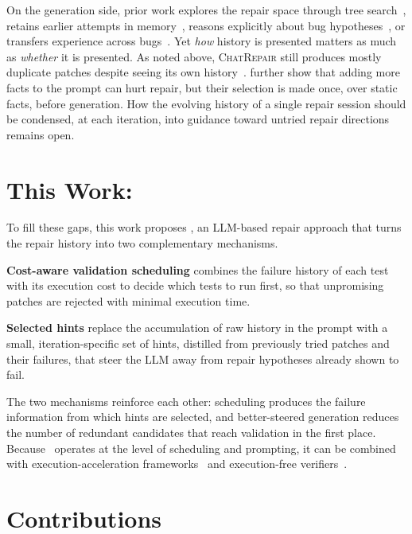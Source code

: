On the generation side, prior work explores the repair space through tree
search~\citep{antoniades2025swesearch}, retains earlier attempts in
memory~\citep{xia2024chatrepair,shinn2023reflexion}, reasons explicitly about
bug hypotheses~\citep{kang2025autosd,yin2024thinkrepair}, or transfers
experience across bugs~\citep{chen2025sweexp}. Yet \emph{how} history is
presented matters as much as \emph{whether} it is presented. As noted above,
\textsc{ChatRepair} still produces mostly duplicate patches despite seeing its
own history~\citep{chen2025conversational}. \citet{parasaram2025factselection}
further show that adding more facts to the prompt can hurt repair, but their
selection is made once, over static facts, before generation. How the evolving
history of a single repair session should be condensed, at each iteration, into
guidance toward untried repair directions remains open.

\section{This Work: \texorpdfstring{\caster}{CASTER}}
\label{sec:intro-caster}

To fill these gaps, this work proposes \caster, an LLM-based repair approach
that turns the repair history into two complementary mechanisms.

\textbf{Cost-aware validation scheduling} combines the failure history of each
test with its execution cost to decide which tests to run first, so that
unpromising patches are rejected with minimal execution time.

\textbf{Selected hints} replace the accumulation of raw history in the prompt
with a small, iteration-specific set of hints, distilled from previously tried
patches and their failures, that steer the LLM away from repair hypotheses
already shown to fail.

The two mechanisms reinforce each other: scheduling produces the failure
information from which hints are selected, and better-steered generation reduces
the number of redundant candidates that reach validation in the first place.
Because \caster\ operates at the level of scheduling and prompting, it can be
combined with execution-acceleration
frameworks~\citep{chen2021uniapr,xiao2024expressapr} and execution-free
verifiers~\citep{jain2025r2egym}.

\section{Contributions}
\label{sec:intro-contributions}

